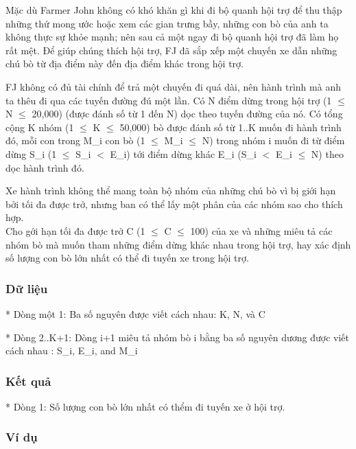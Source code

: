 



   Mặc dù Farmer John không có khó khăn gì khi đi bộ quanh hội trợ để thu thập những thứ mong ước hoặc xem các gian trưng bầy, những con bò của anh ta không thực sự khỏe mạnh; nên sau cả một ngay đi bộ quanh hội trợ đã làm họ rất mệt. Để giúp chúng thích hội trợ, FJ đã sắp xếp một chuyến xe dẫn những chú bò từ địa điểm này đến địa điểm khác trong hội trợ.  

   FJ không có đủ tài chính để trả một chuyến đi quá dài, nên hành trình mà  anh ta thêu đi qua các tuyến đường đú một lần. Có N điểm dừng trong hội  trợ (1  $\le$  N  $\le$  20,000) (được đánh số từ 1 đến N) dọc theo tuyến đường của  nó. Có tổng cộng K nhóm (1  $\le$  K  $\le$  50,000) bò được đánh số từ 1..K muốn đi hành trình đó, mỗi con trong M\_i con bò (1  $\le$  M\_i  $\le$  N) trong nhóm i  muốn đi từ điểm dừng S\_i (1  $\le$  S\_i $<$ E\_i) tới điểm dừng khác E\_i  (S\_i $<$ E\_i  $\le$  N) theo dọc hành trình đó.  

   Xe hành trình không thể mang toàn bộ nhóm của những chú bò vì bị giới hạn  bởi tối đa được trở, nhưng ban có thể lấy một phân của các nhóm sao cho thích hợp.   
\\

   Cho gới hạn tối đa được trở C (1  $\le$  C  $\le$  100) của xe và những miêu tả các  nhóm bò mà muốn tham những điểm dừng khác nhau trong hội trợ, hay xác định  số lượng con bò lớn nhất có thể đi tuyến xe trong hội trợ.  

\subsubsection{   Dữ liệu  }

   * Dòng một 1: Ba số nguyên được viết cách nhau: K, N, và C  

   * Dòng 2..K+1: Dòng i+1 miêu tả nhóm bò i bằng ba số nguyên dương được viết cách nhau : S\_i, E\_i, and M\_i  

\subsubsection{   Kết quả  }

   * Dòng 1: Số lượng con bò lớn nhất có thểm đi tuyến xe ở hội trợ.  

\subsubsection{   Ví dụ  }


